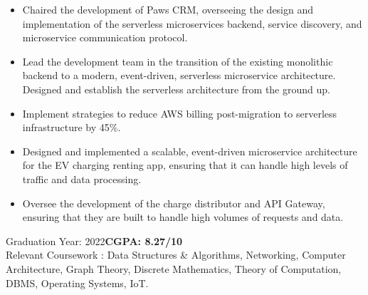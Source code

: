 \documentclass[10pt,a4paper,ragged2e]{classes/altacv}
\begin{document}
\tagline{ }

\begin{fullwidth}
\makecvheader
\end{fullwidth}




\begin{itemize}
\item Chaired the development of Paws CRM, overseeing the design and implementation of the serverless microservices backend, service discovery, and microservice communication protocol.
\item Lead the development team in the transition of the existing monolithic backend to a modern, event-driven, serverless microservice architecture. Designed and establish the serverless architecture from the ground up.
\item Implement strategies to reduce AWS billing post-migration to serverless infrastructure by 45\%.

\end{itemize}

\divider

\begin{itemize}
\item Designed and implemented a scalable, event-driven microservice architecture for the EV charging renting app, ensuring that it can handle high levels of traffic and data processing.
\item Oversee the development of the charge distributor and API Gateway, ensuring that they are built to handle high volumes of requests and data.
\end{itemize}



Graduation Year: 2022\hspace{5mm}\textbf{CGPA: 8.27/10 }\\
\smallskip
Relevant Coursework : Data Structures \& Algorithms, Networking, Computer Architecture, Graph Theory, Discrete Mathematics, Theory of Computation, DBMS, Operating Systems, IoT.
\end{document}
